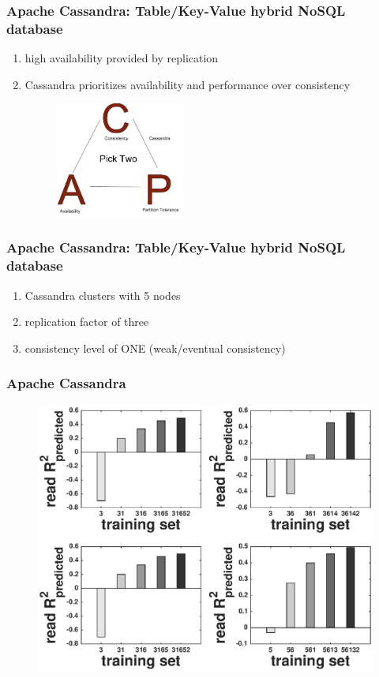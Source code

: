\documentclass{beamer}
\begin{document}
\begin{frame}
\frametitle{Apache Cassandra: Table/Key-Value hybrid NoSQL database}
\begin{enumerate}
\item high availability provided by replication
\item Cassandra prioritizes availability and performance over consistency \begin{figure}[htbp]
\centering
\includegraphics[width=0.4\textwidth]{CAP_diagram.pdf}
\end{figure}
\end{enumerate}
\end{frame}

\begin{frame}
\frametitle{Apache Cassandra: Table/Key-Value hybrid NoSQL database}
\begin{enumerate}
\item Cassandra clusters with 5 nodes
\item replication factor of three
\item consistency level of ONE (weak/eventual consistency)
\end{enumerate}
\end{frame}

\begin{frame}
\frametitle{Apache Cassandra}
  \begin{figure}
    \centering
    \includegraphics[scale = 0.4]{cassandra_bar_read_avg_latency.eps}
  \end{figure}
\end{frame}
\end{document}
